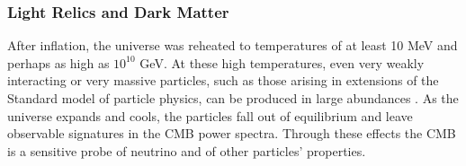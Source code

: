 
\vspace{-0.15in}

\subsubsection{Light Relics and Dark Matter}

\vspace{-0.05in}

After inflation, the universe was reheated to temperatures of at least 10 MeV and perhaps as high as $10^{10}$ GeV.  
At these high temperatures, even very weakly interacting or very massive particles, such as those arising 
in extensions of the Standard model of particle physics, can be produced in large abundances .  As the universe expands and cools, 
the particles fall out of equilibrium and leave observable signatures in the \ac{CMB} power spectra. 
Through these effects the CMB is a sensitive probe of neutrino and of other particles' properties.  

